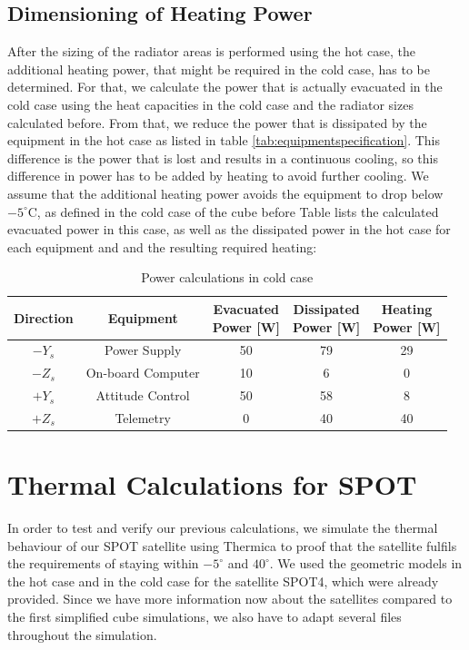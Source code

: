 \subsection{Dimensioning of Heating Power}
After the sizing of the radiator areas is performed using the hot case, the additional heating power, that might be required in the cold case, has to be determined. For that, we calculate the power that is actually evacuated in the cold case using the heat capacities in the cold case and the radiator sizes calculated before. From that, we reduce the power that is dissipated by the equipment in the hot case as listed in table \ref{tab:equipmentspecification}. This difference is the power that is lost and results in a continuous cooling, so this difference in power has to be added by heating to avoid further cooling. We assume that the additional heating power avoids the equipment to drop below $-5^{\circ}$C, as defined in the cold case of the cube before Table lists the calculated evacuated power in this case, as well as the dissipated power in the hot case for each equipment and and the resulting required heating:


\begin{table}[H]
\centering
\begin{tabular}{ | c| c| c| c|c|}
\hline 
Direction& Equipment  & \specialcell{Evacuated \\ Power [W]} & \specialcell{Dissipated\\Power [W]} & \specialcell{Heating \\ Power [W]} \\ \hline
$-Y_{s}$ & Power Supply &  50 & 79 & 29    \\ \hline
$-Z_{s}$ &On-board Computer &10 &6 &  0  \\\hline
$+Y_{s}$ &Attitude Control & 50 & 58 & 8  \\ \hline
$+Z_{s}$ &Telemetry  &  0   & 40 & 40 \\ \hline
\end{tabular}
\caption{Power calculations in cold case}
\label{tab:arrangement}
\end{table}

\section{Thermal Calculations for SPOT}
In order to test and verify our previous calculations, we simulate the thermal behaviour of our SPOT satellite using Thermica to proof that the satellite fulfils the requirements of staying within $-5^{\circ}$ and $40^{\circ}$. We used the geometric models in the hot case and in the cold case for the satellite SPOT4,  which were already provided. Since we have more information now about the satellites compared to the first simplified cube simulations, we also have to adapt several files throughout the simulation. 

